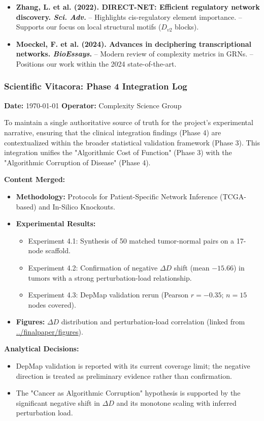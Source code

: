 \begin{itemize}
    \item \textbf{Zhang, L. et al. (2022). DIRECT-NET: Efficient regulatory network discovery. \textit{Sci. Adv.}} 
    -- Highlights cis-regulatory element importance.
    -- Supports our focus on local structural motifs ($D_{v2}$ blocks).

    \item \textbf{Moeckel, F. et al. (2024). Advances in deciphering transcriptional networks. \textit{BioEssays}.} 
    -- Modern review of complexity metrics in GRNs.
    -- Positions our work within the 2024 state-of-the-art.
\end{itemize}

\subsubsection{Scientific Vitacora: Phase 4 Integration Log}
\textbf{Date:} \today 
\textbf{Operator:} Complexity Science Group 

To maintain a single authoritative source of truth for the project's experimental narrative, ensuring that the clinical integration findings (Phase 4) are contextualized within the broader statistical validation framework (Phase 3). This integration unifies the "Algorithmic Cost of Function" (Phase 3) with the "Algorithmic Corruption of Disease" (Phase 4).

\textbf{Content Merged:}
\begin{itemize}
    \item \textbf{Methodology:} Protocols for Patient-Specific Network Inference (TCGA-based) and In-Silico Knockouts.
    \item \textbf{Experimental Results:}
    \begin{itemize}
        \item Experiment 4.1: Synthesis of 50 matched tumor-normal pairs on a 17-node scaffold.
        \item Experiment 4.2: Confirmation of negative $\Delta D$ shift (mean $-15.66$) in tumors with a strong perturbation-load relationship.
        \item Experiment 4.3: DepMap validation rerun (Pearson $r=-0.35$; $n=15$ nodes covered).
    \end{itemize}
    \item \textbf{Figures:} $\Delta D$ distribution and perturbation-load correlation (linked from \url{../finalpaper/figures}).
\end{itemize}

\textbf{Analytical Decisions:}
\begin{itemize}
    \item DepMap validation is reported with its current coverage limit; the negative direction is treated as preliminary evidence rather than confirmation.
    \item The "Cancer as Algorithmic Corruption" hypothesis is supported by the significant negative shift in $\Delta D$ and its monotone scaling with inferred perturbation load.
\end{itemize}


